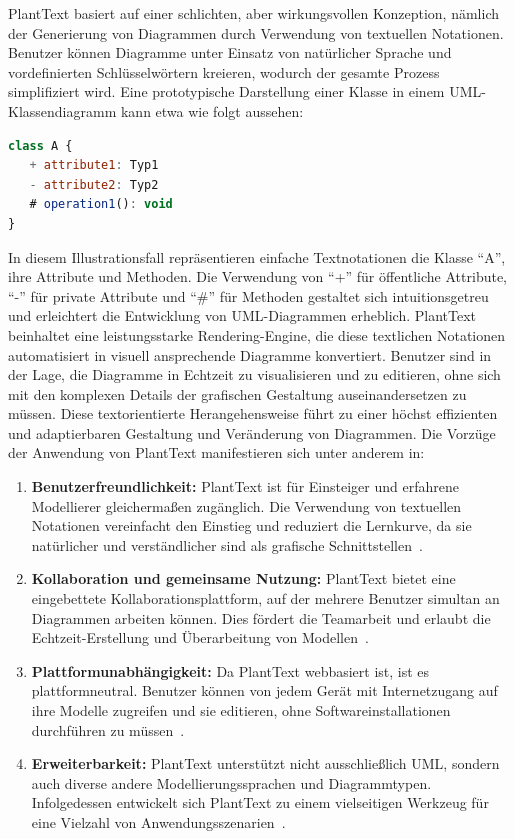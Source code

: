PlantText basiert auf einer schlichten, aber wirkungsvollen Konzeption, nämlich der Generierung von Diagrammen durch
Verwendung von textuellen Notationen. Benutzer können Diagramme unter Einsatz von natürlicher Sprache und vordefinierten
Schlüsselwörtern kreieren, wodurch der gesamte Prozess simplifiziert wird. Eine prototypische Darstellung einer Klasse
in einem UML-Klassendiagramm kann etwa wie folgt aussehen:


\begin{lstlisting}[caption={[Codebeispiel] PlantText code Example}, label={lst:Planttext}, float=!ht, language=javascript]
class A {
   + attribute1: Typ1
   - attribute2: Typ2
   # operation1(): void
}
\end{lstlisting}

In diesem Illustrationsfall repräsentieren einfache Textnotationen die Klasse ``A'', ihre Attribute und Methoden.
Die Verwendung von ``+'' für öffentliche Attribute, ``-'' für private Attribute und ``#'' für Methoden gestaltet sich
intuitionsgetreu und erleichtert die Entwicklung von UML-Diagrammen erheblich. PlantText beinhaltet eine leistungsstarke
Rendering-Engine, die diese textlichen Notationen automatisiert in visuell ansprechende Diagramme konvertiert. Benutzer
sind in der Lage, die Diagramme in Echtzeit zu visualisieren und zu editieren, ohne sich mit den komplexen Details der
grafischen Gestaltung auseinandersetzen zu müssen. Diese textorientierte Herangehensweise führt zu einer höchst
effizienten und adaptierbaren Gestaltung und Veränderung von Diagrammen. Die Vorzüge der Anwendung von PlantText
manifestieren sich unter anderem in:

\begin{enumerate}
    \item \textbf{Benutzerfreundlichkeit:} PlantText ist für Einsteiger und erfahrene Modellierer gleichermaßen zugänglich.
Die Verwendung von textuellen Notationen vereinfacht den Einstieg und reduziert die Lernkurve, da sie natürlicher und
verständlicher sind als grafische Schnittstellen~\cite{mazanec2012general}.
    \item \textbf{Kollaboration und gemeinsame Nutzung:} PlantText bietet eine eingebettete Kollaborationsplattform, auf
der mehrere Benutzer simultan an Diagrammen arbeiten können. Dies fördert die Teamarbeit und erlaubt die
Echtzeit-Erstellung und Überarbeitung von Modellen~\cite{madanayake2017transforming}.
    \item \textbf{Plattformunabhängigkeit:} Da PlantText webbasiert ist, ist es plattformneutral. Benutzer können von
jedem Gerät mit Internetzugang auf ihre Modelle zugreifen und sie editieren, ohne Softwareinstallationen durchführen
zu müssen~\cite{planttext}.
    \item \textbf{Erweiterbarkeit:} PlantText unterstützt nicht ausschließlich UML, sondern auch diverse andere
Modellierungssprachen und Diagrammtypen. Infolgedessen entwickelt sich PlantText zu einem vielseitigen Werkzeug für eine
Vielzahl von Anwendungsszenarien~\cite{planttext}.
\end{enumerate}

